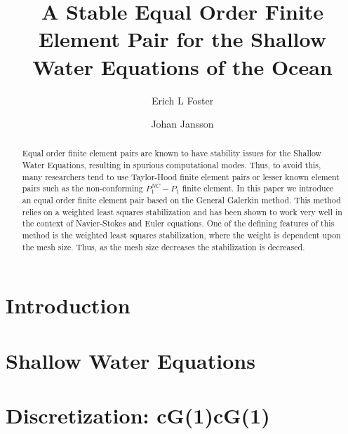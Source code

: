 \documentclass{elsarticle}
\begin{document}
  \begin{frontmatter}
    \author[1]{Erich L Foster}

    \author[1]{Johan Jansson}

    \address[1]{Basque Center for Applied Mathematics, Alameda Mazarredo, 14,
      48009 Bilbao, Basque Country -- Spain}

    \title{A Stable Equal Order Finite Element Pair for the Shallow Water
    Equations of the Ocean}

    \begin{abstract}
      Equal order finite element pairs are known to have stability issues for
      the Shallow Water Equations, resulting in spurious computational modes.
      Thus, to avoid this, many researchers tend to use Taylor-Hood finite
      element pairs or lesser known element pairs such as the non-conforming
      $P_1^{NC}-P_1$ finite element. In this paper we introduce an equal order
      finite element pair based on the General Galerkin method. This method
      relies on a weighted least squares stabilization and has been shown to
      work very well in the context of Navier-Stokes and Euler equations. One of
      the defining features of this method is the weighted least squares
      stabilization, where the weight is dependent upon the mesh size. Thus, as
      the mesh size decreases the stabilization is decreased.
    \end{abstract}
  \end{frontmatter}

  \tableofcontents

  \section{Introduction} \label{sec:Intro}
  

  \section{Shallow Water Equations} \label{sec:SWE}
  

  \section{Discretization: cG(1)cG(1)} \label{sec:Discrete}
  
\end{document}
